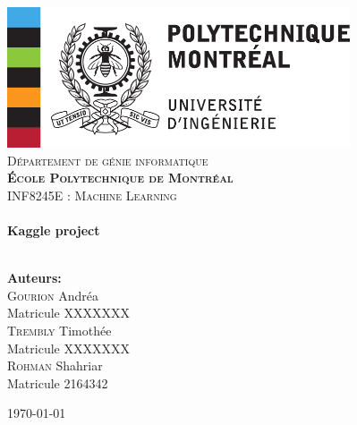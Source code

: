 \begin{center}
    
    \includegraphics[width=0.76\textwidth]{img/poly-logo.png}
    ~\\[1cm]
    
    \textsc{\LARGE Département de génie informatique \\\textbf{École Polytechnique de Montréal}}\\[1.5cm]
    
    \textsc{\Large INF8245E : Machine Learning}\\[0.5cm]
    
    \HRule \\[0.5cm]
    
    {\huge \bfseries Kaggle project} \\[0.5cm]
    
    \HRule \\[1.5cm]
    
    \begin{minipage}{0.4\textwidth}
    \begin{flushleft} \large
    \textbf{\LARGE Auteurs:}\\
    \Large \textsc{Gourion} Andréa\\
    {\large Matricule XXXXXXX}\\
    \Large \textsc{Trembly} Timothée\\
    {\large Matricule XXXXXXX}\\
    \Large  \textsc{Rohman} Shahriar\\
    {\large Matricule 2164342}
    \end{flushleft}
    \end{minipage}
    \begin{minipage}{0.4\textwidth}
    \begin{flushright} \large
    \end{flushright}
    \end{minipage}
    
    \vspace{2cm}
    
    \textsc{\large \today}
    
    \thispagestyle{empty}
    
\end{center}